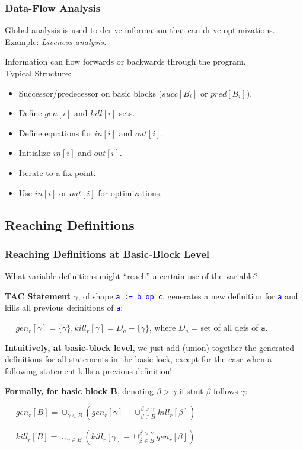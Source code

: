 \documentclass{beamer}
\newcommand{\blue}[1]{\textcolor{Blue}{{#1}}}
\renewcommand{\emph}[1]{\textcolor{structure}{#1}}
\newcommand{\emp}[1]{\textcolor{DikuRed}{ #1}}
\begin{document}
\begin{frame}[fragile,t]
    \frametitle{Data-Flow Analysis}

Global analysis is used to derive information that can drive
optimizations. Example: {\em Liveness analysis.}


\bigskip

Information can flow forwards or backwards through the program.\\
Typical Structure:\smallskip

\begin{itemize}
    \item Successor/predecessor on basic blocks ($succ[B_i]$ or $pred[B_i]$).\smallskip
    \item Define $gen[i]$ and $kill[i]$ sets.\smallskip
    \item Define equations for $in[i]$ and $out[i]$.\smallskip
    \item Initialize $in[i]$ and $out[i]$.\smallskip
    \item Iterate to a fix point.\smallskip
    \item Use $in[i]$ or $out[i]$ for optimizations.
\end{itemize}

\end{frame}


\subsection{Reaching Definitions}

\begin{frame}[fragile,t]
    \frametitle{Reaching Definitions at Basic-Block Level}

\emp{What variable definitions might “reach” a certain use of the variable?}

\bigskip

\emph{\bf \textsc{TAC} Statement $\gamma$}, of shape \blue{\tt a := b op c}, generates a new
definition for \blue{\tt a} and kills all previous definitions of \blue{\tt a}:\medskip

$\mbox{~~~~}gen_r[\gamma] = \{\gamma\}, kill_r[\gamma] = D_a - \{\gamma\}$, where $D_a$ = set of all defs of {\tt a}.


\bigskip

\emph{\bf Intuitively, at basic-block level}, we just add (union) together the
generated definitions for all statements in the basic lock, except for
the case when a following statement kills a previous definition!

\pause
\bigskip

\emph{\bf Formally, for basic block B}, denoting $\beta > \gamma$ if stmt $\beta$ follows $\gamma$:

\medskip

$\mbox{~~~~}gen_r[B] = \cup_{\gamma\in B}(gen_r[\gamma] - \cup_{\beta\in B}^{\beta>\gamma} kill_r[\beta])$

\medskip
$\mbox{~~~~}kill_r[B] = \cup_{\gamma\in B}(kill_r[\gamma] - \cup_{\beta\in B}^{\beta>\gamma} gen_r[\beta])$

\end{frame}
\end{document}
